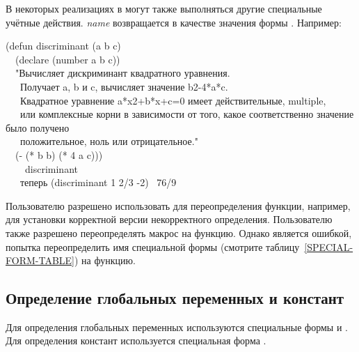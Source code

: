 \begin{defmac}
В некоторых реализациях в  могут также выполняться другие специальные
учётные действия. \emph{name} возвращается в качестве значения формы .
Например:
\begin{lisp}
(defun discriminant (a b c) \\
~~(declare (number a b c)) \\
~~"Вычисляет дискриминант квадратного уравнения. \\
~~~Получает a, b и c, вычисляет значение b{\Xcircumflex}2-4*a*c. \\
~~~Квадратное уравнение a*x{\Xcircumflex}2+b*x+c=0 имеет действительные, multiple, \\
~~~или комплексные корни в зависимости от того, какое соответственно значение было получено \\
~~~положительное, ноль или отрицательное." \\
~~(- (* b b) (* 4 a c))) \\
~~~\EV\ discriminant \\
~~~\textrm{теперь} (discriminant 1 2/3 -2) \EV\ 76/9
\end{lisp}

Пользователю разрешено использовать  для переопределения функции, например, для
установки корректной версии некорректного определения.
Пользователю также разрешено переопределять макрос на функцию.
Однако является ошибкой, попытка переопределить имя специальной формы (смотрите
таблицу~\ref{SPECIAL-FORM-TABLE}) на функцию.
\end{defmac}

\subsection{Определение глобальных переменных и констант}

Для определения глобальных переменных используются  специальные формы
 и . 
Для определения констант используется специальная форма . 

